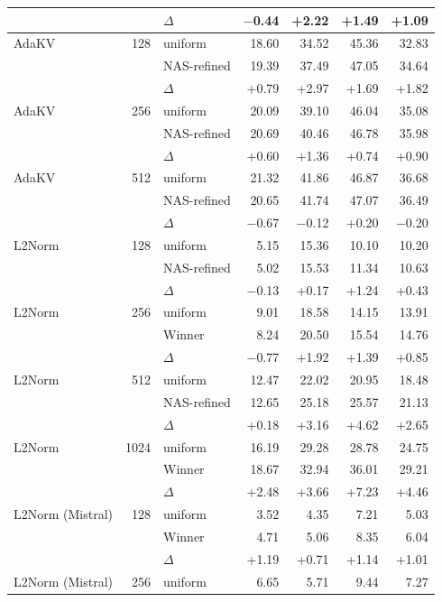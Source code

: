 \begin{table}[tp]
\begin{tabular}{@{}l r l r r r r @{}}
     &  & $\Delta$ & $-$0.44 & +2.22 & +1.49 & +1.09 \\
    \midrule
    AdaKV & 128 & uniform & 18.60 & 34.52 & 45.36 & 32.83 \\
     &  & NAS-refined & 19.39 & 37.49 & 47.05 & 34.64 \\
     &  & $\Delta$ & +0.79 & +2.97 & +1.69 & +1.82 \\
    \midrule
    AdaKV & 256 & uniform & 20.09 & 39.10 & 46.04 & 35.08 \\
     &  & NAS-refined & 20.69 & 40.46 & 46.78 & 35.98 \\
     &  & $\Delta$ & +0.60 & +1.36 & +0.74 & +0.90 \\
    \midrule
    AdaKV & 512 & uniform & 21.32 & 41.86 & 46.87 & 36.68 \\
     &  & NAS-refined & 20.65 & 41.74 & 47.07 & 36.49 \\
     &  & $\Delta$ & $-$0.67 & $-$0.12 & +0.20 & $-$0.20 \\
    \midrule
    L2Norm & 128 & uniform & 5.15 & 15.36 & 10.10 & 10.20 \\
     &  & NAS-refined & 5.02 & 15.53 & 11.34 & 10.63 \\
     &  & $\Delta$ & $-$0.13 & +0.17 & +1.24 & +0.43 \\
    \midrule
    L2Norm & 256 & uniform & 9.01 & 18.58 & 14.15 & 13.91 \\
     &  & Winner & 8.24 & 20.50 & 15.54 & 14.76 \\
     &  & $\Delta$ & $-$0.77 & +1.92 & +1.39 & +0.85 \\
    \midrule
    L2Norm & 512 & uniform & 12.47 & 22.02 & 20.95 & 18.48 \\
     &  & NAS-refined & 12.65 & 25.18 & 25.57 & 21.13 \\
     &  & $\Delta$ & +0.18 & +3.16 & +4.62 & +2.65 \\
    \midrule
    L2Norm & 1024 & uniform & 16.19 & 29.28 & 28.78 & 24.75 \\
     &  & Winner & 18.67 & 32.94 & 36.01 & 29.21 \\
     &  & $\Delta$ & +2.48 & +3.66 & +7.23 & +4.46 \\
    \midrule
    L2Norm (Mistral) & 128 & uniform & 3.52 & 4.35 & 7.21 & 5.03 \\
     &  & Winner & 4.71 & 5.06 & 8.35 & 6.04 \\
     &  & $\Delta$ & +1.19 & +0.71 & +1.14 & +1.01 \\
    \midrule
    L2Norm (Mistral) & 256 & uniform & 6.65 & 5.71 & 9.44 & 7.27 \\

\end{tabular}
\end{table}
